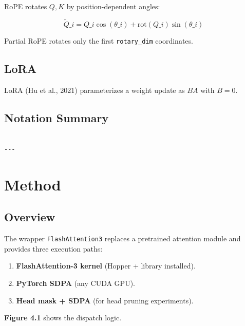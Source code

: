 RoPE rotates $Q, K$ by position-dependent angles:

\[
\tilde{Q}\_i = Q\_i \cos(\theta\_i) + \text{rot}(Q\_i) \sin(\theta\_i)
\tag{3.8}
\]

Partial RoPE rotates only the first \texttt{rotary\_dim} coordinates.

\subsection{LoRA}

LoRA (Hu et al., 2021) parameterizes a weight update as $BA$ with $B = 0$.

\subsection{Notation Summary}

\begin{lstlisting}

---
\end{lstlisting}

\section{Method}

\subsection{Overview}

The wrapper \texttt{FlashAttention3} replaces a pretrained attention module and 
provides three execution paths:

\begin{enumerate}
\item \textbf{FlashAttention-3 kernel} (Hopper + library installed).
\item \textbf{PyTorch SDPA} (any CUDA GPU).
\item \textbf{Head mask + SDPA} (for head pruning experiments).

\end{enumerate}
\textbf{Figure 4.1} shows the dispatch logic.

